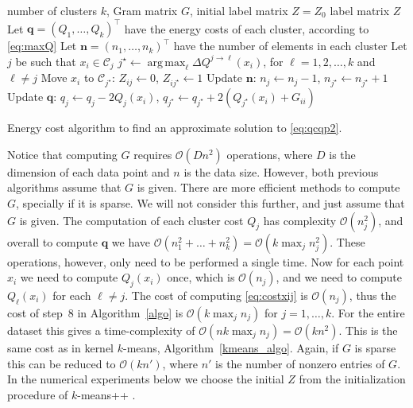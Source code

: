 \documentclass[aps,preprint,nofootinbib,floatfix]{revtex4-1}
\DeclareMathOperator*{\argmax}{arg\,max}
\newcommand\C{{\mathcal{C}}}
\newcommand\OO{{\mathcal{O}}}
\begin{document}
\begin{algorithm}[H]
\vspace{.5em}
\begin{algorithmic}[1]
    \INPUT number of clusters $k$, Gram matrix $G$, 
                initial label matrix $Z=Z_0$
    \OUTPUT label matrix $Z$
  \STATE Let $\bm{q} = (Q_1, \dotsc, Q_k)^\top$ 
            have the energy costs of each cluster, according to \eqref{eq:maxQ}
  \STATE Let $\bm{n} = (n_1,\dotsc,n_k)^\top$ have the number of elements
        in each cluster
  \REPEAT
        \STATE Let $j$ be such that $x_i \in \C_j$
        \STATE $j^\star \leftarrow \argmax_{\ell} \Delta Q^{j\to \ell}(x_i)$, 
            for $\ell=1,2,\dots,k$ and $\ell \ne j$ \label{stepmove}
            \STATE Move $x_i$ to $\C_{j^\star}$: $Z_{ij} \leftarrow 0$,
            $Z_{ij^\star} \leftarrow 1$
            \STATE Update $\bm{n}$: $n_j \leftarrow n_j - 1$,
                    $n_{j^\star} \leftarrow n_{j^\star} + 1$
            \STATE Update $\bm{q}$: $q_j \leftarrow q_j - 2Q_j(x_i)$, 
    $q_{j^\star} \leftarrow q_{j^\star} + 2\left(Q_{j^\star}(x_i)+
    G_{ii}\right)$
        \ENDIF
    \ENDFOR
\end{algorithmic}
\caption{\label{algo}
Energy cost algorithm to find an approximate solution to \eqref{eq:qcqp2}.}
\end{algorithm}

Notice that computing $G$ requires $\OO( D n^2)$ operations, where 
$D$ is the dimension of each data point and $n$ is the data size. However,
both previous algorithms assume that $G$ is given. There are more efficient
methods to compute $G$, specially if it is sparse. We will not consider
this further, and just assume that $G$ is given.
The computation of each cluster cost
$Q_j$ has complexity $\OO(n_j^2)$, and overall to compute $\bm{q}$
we have $\OO(n_1^2+\dots + n_k^2) = \OO(k \max_j n_j^2)$. 
These operations, however, only need to be performed a single time. Now for
each point $x_i$ we need to compute $Q_j(x_i)$ once, which is
$\OO(n_j)$, and we need to compute $Q_\ell(x_i)$ for each $\ell\ne j$. 
The cost of computing 
\eqref{eq:costxij} is $\OO(n_j)$, thus the cost of step~$8$ in
Algorithm~\ref{algo} is $\OO(k \max_j n_j)$ for $j=1,\dotsc,k$.
For the 
entire dataset this gives a time-complexity
of $\OO(n k  \max_j n_j) =\OO(k n^2)$. This is the same cost as
in kernel $k$-means, Algorithm~\ref{kmeans_algo}. Again, if $G$ is sparse
this can be reduced to $\OO(k n')$, where $n'$ is the number of nonzero
entries of $G$.
In the numerical experiments below
we choose the initial $Z$ from the initialization 
procedure of $k$-means++ \cite{Vassilvitskii}. 
\end{document}
